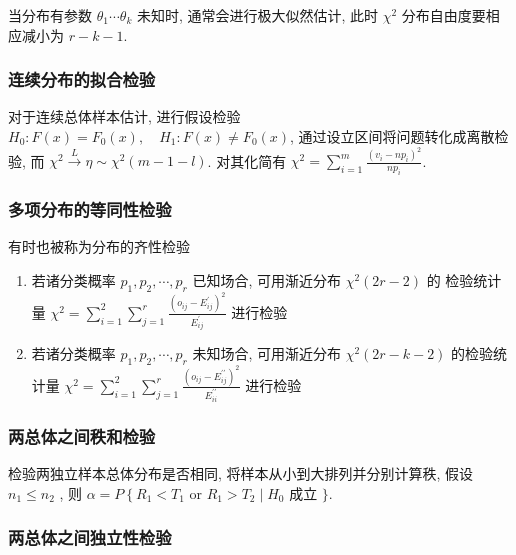 \documentclass[10pt]{yerbaformat}
\begin{document}
\par 当分布有参数 $\theta_{1} \cdots \theta_{k}$ 未知时, 通常会进行极大似然估计, 此时 $\chi^2$ 分布自由度要相应减小为 $r-k-1$.

\subsubsection{连续分布的拟合检验}

\par 对于连续总体样本估计, 进行假设检验 $H_{0}: F(x)=F_{0}(x), \quad H_{1}: F(x) \neq F_{0}(x)$, 通过设立区间将问题转化成离散检验, 而 $\chi^{2} \stackrel{L}{\rightarrow} \eta \sim \chi^{2}(m-1-l)$. 对其化简有 $\chi^{2}=\sum_{i=1}^{m} \frac{\left(v_{i}-n p_{i}\right)^{2}}{n p_{i}}$.

\subsubsection{多项分布的等同性检验}

\par 有时也被称为分布的齐性检验
\begin{enumerate}
    \item 若诸分类概率 $p_{1}, p_{2}, \cdots, p_{r}$ 已知场合, 可用渐近分布 $\chi^{2}(2 r-2)$ 的 检验统计量 $\chi^{2}=\sum_{i=1}^{2} \sum_{j=1}^{r} \frac{\left(o_{i j}-E_{i j}^{\prime}\right)^{2}}{E_{i j}^{\prime}}$ 进行检验
    \item 若诸分类概率 $p_{1}, p_{2}, \cdots, p_{r}$ 未知场合, 可用渐近分布 $\chi^{2}(2 r-k-2)$ 的检验统计量 $\chi^{2}=\sum_{i=1}^{2} \sum_{j=1}^{r} \frac{\left(o_{i j}-E_{i j}^{\prime \prime}\right)^{2}}{E_{i i}^{\prime \prime}}$ 进行检验
\end{enumerate}

\subsubsection{两总体之间秩和检验}

\par 检验两独立样本总体分布是否相同, 将样本从小到大排列并分别计算秩, 假设 $n_1 \leq n_2$ , 则 $\alpha=P\left\{R_{1}<T_{1}\right.$ or $R_{1}>T_{2} \mid H_{0}$ 成立 $\}$.

\subsubsection{两总体之间独立性检验}
\end{document}
